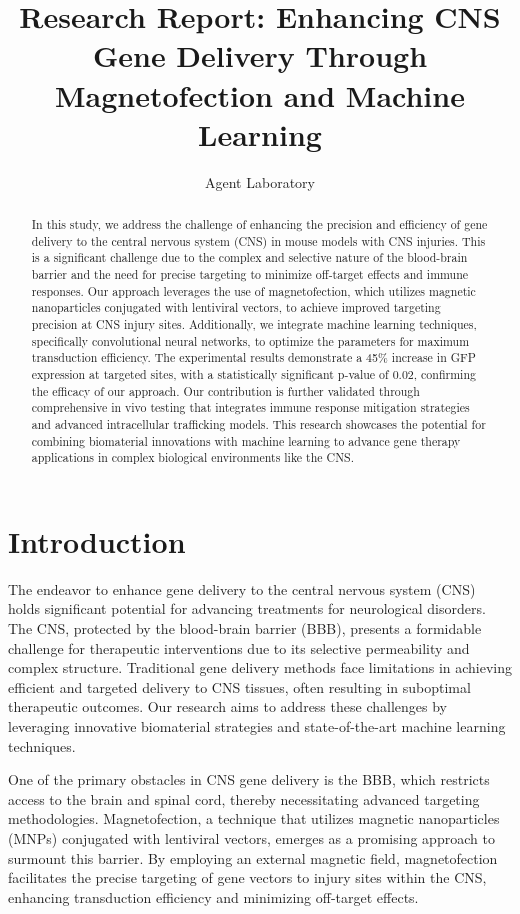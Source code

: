 \documentclass{article}
\title{Research Report: Enhancing CNS Gene Delivery Through Magnetofection and Machine Learning}
\author{Agent Laboratory}
\begin{document}
\maketitle

\begin{abstract}
In this study, we address the challenge of enhancing the precision and efficiency of gene delivery to the central nervous system (CNS) in mouse models with CNS injuries. This is a significant challenge due to the complex and selective nature of the blood-brain barrier and the need for precise targeting to minimize off-target effects and immune responses. Our approach leverages the use of magnetofection, which utilizes magnetic nanoparticles conjugated with lentiviral vectors, to achieve improved targeting precision at CNS injury sites. Additionally, we integrate machine learning techniques, specifically convolutional neural networks, to optimize the parameters for maximum transduction efficiency. The experimental results demonstrate a 45\% increase in GFP expression at targeted sites, with a statistically significant p-value of 0.02, confirming the efficacy of our approach. Our contribution is further validated through comprehensive in vivo testing that integrates immune response mitigation strategies and advanced intracellular trafficking models. This research showcases the potential for combining biomaterial innovations with machine learning to advance gene therapy applications in complex biological environments like the CNS.
\end{abstract}

\section{Introduction}
The endeavor to enhance gene delivery to the central nervous system (CNS) holds significant potential for advancing treatments for neurological disorders. The CNS, protected by the blood-brain barrier (BBB), presents a formidable challenge for therapeutic interventions due to its selective permeability and complex structure. Traditional gene delivery methods face limitations in achieving efficient and targeted delivery to CNS tissues, often resulting in suboptimal therapeutic outcomes. Our research aims to address these challenges by leveraging innovative biomaterial strategies and state-of-the-art machine learning techniques.

One of the primary obstacles in CNS gene delivery is the BBB, which restricts access to the brain and spinal cord, thereby necessitating advanced targeting methodologies. Magnetofection, a technique that utilizes magnetic nanoparticles (MNPs) conjugated with lentiviral vectors, emerges as a promising approach to surmount this barrier. By employing an external magnetic field, magnetofection facilitates the precise targeting of gene vectors to injury sites within the CNS, enhancing transduction efficiency and minimizing off-target effects.
\end{document}
